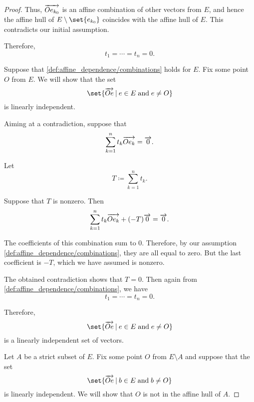 \begin{proof}
  Thus, \( \overrightarrow{O e_{k_0}} \) is an affine combination of other vectors from \( E \), and hence the affine hull of \( E \setminus \set{ e_{k_0} } \) coincides with the affine hull of \( E \). This contradicts our initial assumption.

  Therefore,
  \begin{equation*}
    t_1 = \cdots = t_n = 0.
  \end{equation*}

   Suppose that \cref{def:affine_dependence/combinations} holds for \( E \). Fix some point \( O \) from \( E \). We will show that the set
  \begin{equation*}
    \set{ \vect{O e} \given e \in E \T{and} e \neq O }
  \end{equation*}
  is linearly independent.

  Aiming at a contradiction, suppose that
  \begin{equation*}
    \sum_{k=1}^n t_k \overrightarrow{O e_k} = \overrightarrow{0}.
  \end{equation*}

  Let
  \begin{equation*}
    T \coloneqq \sum_{k=1}^n t_k.
  \end{equation*}

  Suppose that \( T \) is nonzero. Then
  \begin{equation*}
    \sum_{k=1}^n t_k \overrightarrow{O e_k} + (-T) \overrightarrow{0} = \overrightarrow{0}.
  \end{equation*}

  The coefficients of this combination sum to \( 0 \). Therefore, by our assumption \cref{def:affine_dependence/combinations}, they are all equal to zero. But the last coefficient is \( -T \), which we have assumed is nonzero.

  The obtained contradiction shows that \( T = 0 \). Then again from \cref{def:affine_dependence/combinations}, we have
  \begin{equation*}
    t_1 = \cdots = t_n = 0.
  \end{equation*}

  Therefore,
  \begin{equation*}
    \set{ \vect{O e} \given e \in E \T{and} e \neq O }
  \end{equation*}
  is a linearly independent set of vectors.

   Let \( A \) be a strict subset of \( E \). Fix some point \( O \) from \( E \setminus A \) and suppose that the set
  \begin{equation*}
    \set{ \vect{O e} \given b \in E \T{and} b \neq O }
  \end{equation*}
  is linearly independent. We will show that \( O \) is not in the affine hull of \( A \).


\end{proof}
